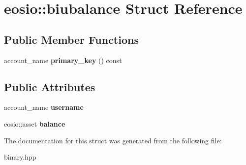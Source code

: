 \hypertarget{structeosio_1_1biubalance}{}\section{eosio\+:\+:biubalance Struct Reference}
\label{structeosio_1_1biubalance}
\subsection*{Public Member Functions}
\begin{DoxyCompactItemize}
\item 
\mbox{\label{structeosio_1_1biubalance_ad46d6473f7cc4a6f9d3f26dcbeeba531}} 
account\+\_\+name {\bfseries primary\+\_\+key} () const
\end{DoxyCompactItemize}
\subsection*{Public Attributes}
\begin{DoxyCompactItemize}
\item 
\mbox{\label{structeosio_1_1biubalance_a75d8e7bf0c7574d6d4be0d570bd5229a}} 
account\+\_\+name {\bfseries username}
\item 
\mbox{\label{structeosio_1_1biubalance_ad03ab7939c3bd9276edcc7cf956246df}} 
eosio\+::asset {\bfseries balance}
\end{DoxyCompactItemize}


The documentation for this struct was generated from the following file\+:\begin{DoxyCompactItemize}
\item 
binary.\+hpp\end{DoxyCompactItemize}
